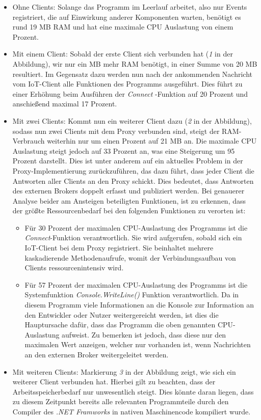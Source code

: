     \begin{itemize}
        \item Ohne Clients:
        Solange das Programm im Leerlauf arbeitet, also nur Events registriert, die auf Einwirkung anderer Komponenten warten, benötigt es rund 19 \ac{MB} \ac{RAM} und hat eine maximale \ac{CPU} Auslastung von einem Prozent.
        \item Mit einem Client:
        Sobald der erste Client sich verbunden hat (\emph{1} in der Abbildung), wir nur ein \ac{MB} mehr \ac{RAM} benötigt, in einer Summe von 20 \ac{MB} resultiert. Im Gegensatz dazu werden nun nach der ankommenden Nachricht vom \ac{IoT}-Client alle Funktionen des Programms ausgeführt. Dies führt zu einer Erhöhung beim Ausführen der \emph{Connect} -Funktion auf 20 Prozent und anschießend maximal 17 Prozent.
        \item Mit zwei Clients:
        Kommt nun ein weiterer Client dazu (\emph{2} in der Abbildung), sodass nun zwei Clients mit dem Proxy verbunden sind, steigt der \ac{RAM}-Verbrauch weiterhin nur um einen Prozent auf 21 \ac{MB} an. Die maximale \ac{CPU} Auslastung steigt jedoch auf 33 Prozent an, was eine Steigerung um 95 Prozent darstellt. Dies ist unter anderem auf ein aktuelles Problem in der Proxy-Implementierung %
        zurückzuführen, das dazu führt, dass jeder Client die Antworten aller Clients an den Proxy schickt. Dies bedeutet, dass Antworten des externen Brokers doppelt erfasst und publiziert werden.
        Bei genauerer Analyse beider am Ansteigen beteiligten Funktionen, ist zu erkennen, dass der größte Ressourcenbedarf bei den folgenden Funktionen zu verorten ist:
        \begin{itemize}
            \item Für 30 Prozent der maximalen \ac{CPU}-Auslastung des Programms ist die \emph{Connect}-Funktion verantwortlich. Sie wird aufgerufen, sobald sich ein \ac{IoT}-Client bei dem Proxy registriert. Sie beinhaltet mehrere kaskadierende Methodenaufrufe, womit der Verbindungsaufbau von Clients ressourcenintensiv wird.  
            \item Für 57 Prozent der maximalen \ac{CPU}-Auslastung des Programms ist die Systemfunktion \emph{Console.WriteLine()} Funktion verantwortlich. Da in diesem Programm viele Informationen an die Konsole zur Information an den Entwickler oder Nutzer weitergereicht werden, ist dies die Hauptursache dafür, dass das Programm die oben genannten \ac{CPU}-Auslastung aufweist. Zu bemerken ist jedoch, dass diese nur den maximalen Wert anzeigen, welcher nur vorhanden ist, wenn Nachrichten an den externen Broker weitergeleitet werden.
        \end{itemize}
        \item Mit weiteren Clients:
        Markierung \emph{3} in der Abbildung zeigt, wie sich ein weiterer Client verbunden hat. Hierbei gilt zu beachten, dass der Arbeitsspeicherbedarf nur unwesentlich steigt. Dies könnte daran liegen, dass zu diesem Zeitpunkt bereits alle relevanten Programmteile durch den Compiler des \emph{.NET Framworks} in nativen Maschinencode kompiliert wurde.
    \end{itemize}
